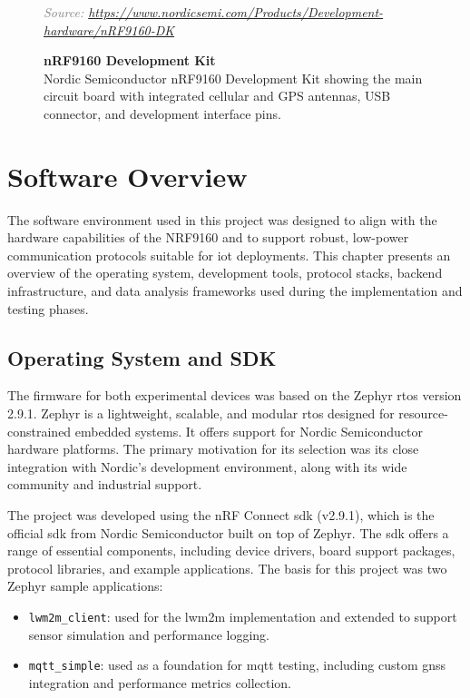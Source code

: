 \documentclass[12pt, english, openany]{book}
\begin{document}
\begin{figure}[htbp]
    \caption{
        \textbf{nRF9160 Development Kit} \\
        Nordic Semiconductor nRF9160 Development Kit showing the main circuit board with integrated cellular and GPS antennas, USB connector, and development interface pins.
    }
    \vspace{0.5em}
    \textcolor{gray}{\footnotesize \textit{Source: \url{https://www.nordicsemi.com/Products/Development-hardware/nRF9160-DK}}}
    \label{fig:NRF9160DK}
\end{figure}




\section{Software Overview} \label{sec:software_overview}

The software environment used in this project was designed to align with the hardware capabilities of the NRF9160 and to support robust, low-power communication protocols suitable for \gls{iot} deployments. This chapter presents an overview of the operating system, development tools, protocol stacks, backend infrastructure, and data analysis frameworks used during the implementation and testing phases.

\subsection{Operating System and SDK}

The firmware for both experimental devices was based on the Zephyr \gls{rtos} version 2.9.1. Zephyr is a lightweight, scalable, and modular \gls{rtos} designed for resource-constrained embedded systems. It offers support for Nordic Semiconductor hardware platforms. The primary motivation for its selection was its close integration with Nordic's development environment, along with its wide community and industrial support.

The project was developed using the nRF Connect \gls{sdk} (v2.9.1), which is the official \gls{sdk} from Nordic Semiconductor built on top of Zephyr. The \gls{sdk} offers a range of essential components, including device drivers, board support packages, protocol libraries, and example applications. The basis for this project was two Zephyr sample applications:

\begin{itemize}
    \item \texttt{lwm2m\_client}: used for the \gls{lwm2m} implementation and extended to support sensor simulation and performance logging.
    \item \texttt{mqtt\_simple}: used as a foundation for \gls{mqtt} testing, including custom \gls{gnss} integration and performance metrics collection.
\end{itemize}
\end{document}
